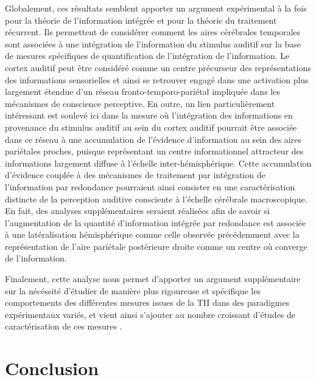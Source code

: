 Globalement, ces résultats semblent apporter un argument expérimental à la fois pour la théorie de l'information intégrée et pour la théorie du traitement récurrent. 
Ils permettent de considérer comment les aires cérébrales temporales sont associées à une intégration de l'information du stimulus auditif sur la base de mesures spécifiques de quantification de l'intégration de l'information. 
Le cortex auditif peut être considéré comme un centre précurseur des représentations des informations sensorielles et ainsi se retrouver engagé dans une activation plus largement étendue d'un réseau fronto-temporo-pariétal impliquée dans les mécanismes de conscience perceptive. 
En outre, un lien particulièrement intéressant est soulevé ici dans la mesure où l'intégration des informations en provenance du stimulus auditif au sein du cortex auditif pourrait être associée dans ce réseau à une accumulation de l'évidence d'information au sein des aires pariétales proches, puisque représentant un centre informationnel attracteur des informations largement diffuse à l'échelle inter-hémisphérique. 
Cette accumulation d'évidence couplée à des mécanismes de traitement par intégration de l'information par redondance pourraient ainsi consister en une caractérisation distincte de la perception auditive consciente à l'échelle cérébrale macroscopique. 
En fait, des analyses supplémentaires seraient réalisées afin de savoir si l'augmentation de la quantité d'information intégrée par redondance est associée à une latéralisation hémisphérique comme celle observée précédemment avec la représentation de l'aire pariétale postérieure droite comme un centre où converge de l'information. 

Finalement, cette analyse nous permet d'apporter un argument supplémentaire sur la nécéssité d'étudier de manière plus rigoureuse et spécifique les comportements des différentes mesures issues de la TII dans des paradigmes expérimentaux variés, et vient ainsi s'ajouter au nombre croissant d'études de caractérisation de ces mesures \citep{barrett2011practical, barrett2019phi, haun2016contents, haun2017conscious, isler2018integrated, kim2018estimating, kim2019criticality, kitazono2018efficient, mediano2019measuring, oizumi2016measuring, seth2011causal, tegmark2016improved, toker2019information}. 

\newpage
\section{Conclusion}
\label{conclusionchapitre5}

